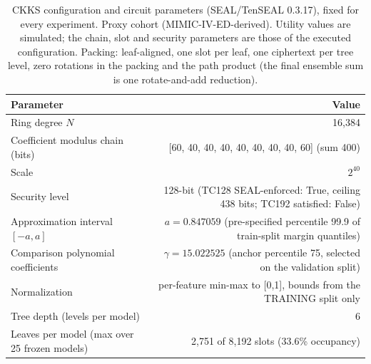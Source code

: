 \begin{table}[t]
\centering
\caption{CKKS configuration and circuit parameters (SEAL/TenSEAL 0.3.17), fixed for every experiment. Proxy cohort (MIMIC-IV-ED-derived). Utility values are simulated; the chain, slot and security parameters are those of the executed configuration. Packing: leaf-aligned, one slot per leaf, one ciphertext per tree level, zero rotations in the packing and the path product (the final ensemble sum is one rotate-and-add reduction).}
\label{tab:t3_ckks_circuit_config}
\begin{tabular}{lr}
\toprule
Parameter & Value \\
\midrule
Ring degree $N$ & 16,384 \\
Coefficient modulus chain (bits) & [60, 40, 40, 40, 40, 40, 40, 40, 60] (sum 400) \\
Scale & $2^{40}$ \\
Security level & 128-bit (TC128 SEAL-enforced: True, ceiling 438 bits; TC192 satisfied: False) \\
Approximation interval $[-a,a]$ & $a=0.847059$ (pre-specified percentile 99.9 of train-split margin quantiles) \\
Comparison polynomial coefficients & $\gamma=15.022525$ (anchor percentile 75, selected on the validation split) \\
Normalization & per-feature min-max to [0,1], bounds from the TRAINING split only \\
Tree depth (levels per model) & 6 \\
Leaves per model (max over 25 frozen models) & 2,751 of 8,192 slots (33.6\% occupancy) \\
\bottomrule
\end{tabular}
\end{table}
